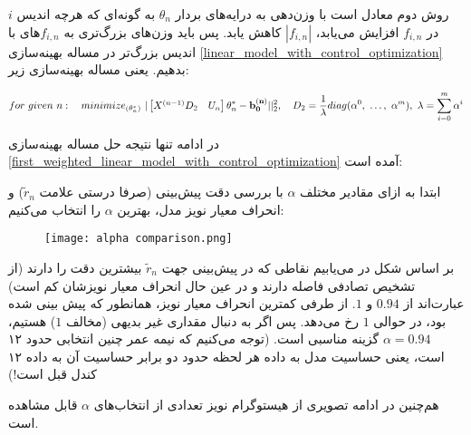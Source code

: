 \documentclass{scribe-cgenomics}
\begin{document}
روش دوم معادل است با وزن‌دهی به درایه‌های بردار
$\theta_n$
به گونه‌ای که هرچه اندیس
$i$
در
$f_{i, n}$
افزایش می‌یابد،
$|f_{i,n}|$
کاهش یابد. پس باید وزن‌های بزرگ‌تری به
$f_{i,n}$های
با اندیس بزرگ‌تر در مساله بهینه‌سازی
\ref{linear_model_with_control_optimization}
بدهیم. یعنی مساله بهینه‌سازی زیر:

\label{second_weighted_linear_model_with_control_optimization}
\begin{equation}
for\ given\ n:\quad minimize_{(\theta^*_n)}\ |
\begin{bmatrix}
X^{(n-1)}D_2 & U_n
\end{bmatrix}
\theta^*_n - \bold{b^{(n)}_0}||_2^2,
\quad
D_2 = \dfrac{1}{\lambda}diag(\alpha^0,\ \dots, \ \alpha^{m}),\ \lambda= \sum_{i=0}^{m} \alpha^i
\end{equation}

در ادامه تنها نتیجه حل مساله بهینه‌سازی
\ref{first_weighted_linear_model_with_control_optimization}
آمده‌ است:

\begin{مشاهده}
ابتدا به ازای مقادیر مختلف
$\alpha$
با بررسی دقت پیش‌بینی (صرفا درستی علامت
$\tilde{r}_n$)
و انحراف معیار نویز مدل، بهترین
$\alpha$
را انتخاب می‌کنیم:

\begin{figure}[h]
\texttt{[image: alpha comparison.png]}
\centering
\end{figure}

بر اساس شکل در می‌یابیم نقاطی که در پیش‌بینی جهت
$\tilde{r}_n$
بیشترین دقت را دارند (از تشخیص تصادفی فاصله دارند و در عین حال انحراف معیار نویزشان کم است) عبارت‌اند از
$0.94$
و
$1$.
از طرفی کمترین انحراف معیار نویز، همانطور که پیش بینی شده بود، در حوالی 
$1$
رخ می‌دهد. پس اگر به دنبال مقداری غیر بدیهی (مخالف
$1$)
هستیم،
$\alpha=0.94$
گزینه مناسبی است. (توجه می‌کنیم که نیمه عمر چنین انتخابی حدود ۱۲ است، یعنی حساسیت مدل به داده هر لحظه حدود دو برابر حساسیت آن به داده ۱۲ کندل قبل است!)

هم‌چنین در ادامه تصویری از هیستوگرام نویز تعدادی از انتخاب‌های
$\alpha$
قابل مشاهده است.

\begin{figure}
 \\
\label{alpha_values}
\centering
\end{figure}
\end{مشاهده}
\end{document}
